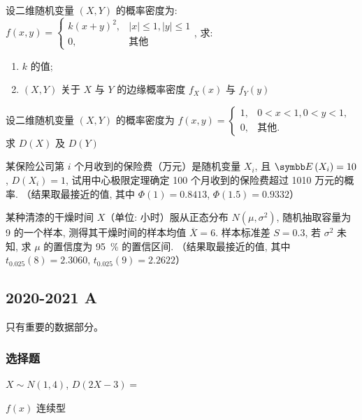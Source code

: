 \begin{ti}
	设二维随机变量 $(X,Y)$ 的概率密度为: $f(x,y) = \begin{cases}
		k (x+y)^2, & |x| \leqslant 1, |y| \leqslant 1 \\
		0, & \text{其他}
	\end{cases}$, 
	求:
	\begin{enumerate}
		\item $k$ 的值;
		\item $(X,Y)$ 关于 $X$ 与 $Y$ 的边缘概率密度 $f_X(x)$ 与 $f_Y(y)$
	\end{enumerate}
\end{ti}

\begin{ti}
	设二维随机变量 $(X,Y)$ 的概率密度为 $f(x,y) = \begin{cases}
		1, & 0 < x < 1, 0 < y < 1, \\
		0, & \text{其他}.
	\end{cases}$ 求 $D(X)$ 及 $D(Y)$
\end{ti}

\begin{ti}
	某保险公司第 $i$ 个月收到的保险费（万元）是随机变量 $X_i$, 且 $\EE(X_i) = 10$, $D(X_i) = 1$, 试用中心极限定理确定 100 个月收到的保险费超过 1010 万元的概率. （结果取最接近的值, 其中 $\varPhi(1) = 0.8413$, $\varPhi(1.5) = 0.9332$）
\end{ti}

\begin{ti}
	某种清漆的干燥时间 $X$（单位: 小时）服从正态分布 $N(\mu,\sigma^2)$, 随机抽取容量为 9 的一个样本, 测得其干燥时间的样本均值 $\overline{X} = 6$. 样本标准差 $S = 0.3$, 若 $\sigma^2$ 未知, 求 $\mu$ 的置信度为 \SI{95}{\percent} 的置信区间. （结果取最接近的值, 其中 $t_{0.025}(8) = 2.3060$, $t_{0.025}(9) = 2.2622$）
\end{ti}

\subsection{2020-2021 A}
只有重要的数据部分。
\subsubsection{选择题}
\begin{ti}
	$X \sim N(1,4)$, $D(2X-3) = $ \kuo
\end{ti}

\begin{ti}
	$f(x)$ 连续型 \kuo
\end{ti}

